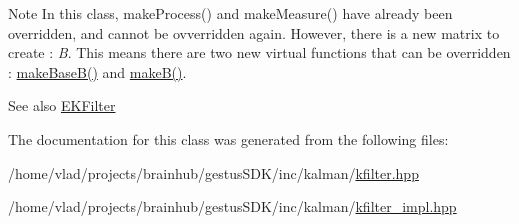 \begin{DoxyNote}{Note}
In this class, {\ttfamily make\+Process()} and {\ttfamily make\+Measure()} have already been overridden, and cannot be ovverridden again. However, there is a new matrix to create \+: {\itshape B}. This means there are two new virtual functions that can be overridden \+: {\ttfamily \mbox{\hyperlink{classKalman_1_1KFilter_ad829fa98bfde372eddd58a101d77c2a5}{make\+Base\+B()}}} and {\ttfamily \mbox{\hyperlink{classKalman_1_1KFilter_a7bb1962fff6c84f050f4b7b619d86eaf}{make\+B()}}}. 
\end{DoxyNote}
\begin{DoxySeeAlso}{See also}
{\ttfamily \mbox{\hyperlink{classKalman_1_1EKFilter}{E\+K\+Filter}}} 
\end{DoxySeeAlso}


The documentation for this class was generated from the following files\+:\begin{DoxyCompactItemize}
\item 
/home/vlad/projects/brainhub/gestus\+S\+D\+K/inc/kalman/\mbox{\hyperlink{kfilter_8hpp}{kfilter.\+hpp}}\item 
/home/vlad/projects/brainhub/gestus\+S\+D\+K/inc/kalman/\mbox{\hyperlink{kfilter__impl_8hpp}{kfilter\+\_\+impl.\+hpp}}\end{DoxyCompactItemize}
